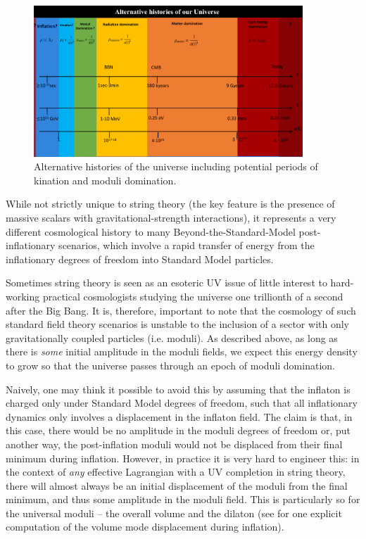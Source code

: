 \begin{figure}[ht]
    \centering
    \includegraphics[width = 0.9\textwidth]{Sections/Figures/FigureAlternativeHistory.pdf} 
    \caption{Alternative histories of the universe including potential periods of kination and moduli domination.}
    \label{fig:AlternativeHistory}
\end{figure}

While not strictly unique to string theory (the key feature is the presence of massive scalars with gravitational-strength interactions), it represents a very different cosmological history to many Beyond-the-Standard-Model post-inflationary scenarios, which involve a rapid transfer of energy from the inflationary degrees of freedom into Standard Model particles.

Sometimes string theory is seen as an esoteric UV issue of little interest to hard-working practical cosmologists studying the universe one trillionth of a second after the Big Bang. It is, therefore, important to note that the cosmology of such standard field theory scenarios is unstable to the inclusion of a sector with only gravitationally coupled particles (i.e. moduli). As described above, as long as there is \emph{some} initial amplitude in the moduli fields, we expect this energy density to grow so that the universe passes through an epoch of moduli domination.

Naively, one may think it possible to avoid this by assuming that the inflaton is charged only under Standard Model degrees of freedom, 
such that all inflationary dynamics only involves a displacement in the inflaton field. The claim is that, in this case, there would be no amplitude in the moduli degrees of freedom or, put another way, the post-inflation moduli would not be displaced from their final minimum during inflation. However, in practice it is very hard to engineer this: in the context of \emph{any} effective Lagrangian with a UV completion in string theory, there will almost always be an initial displacement of the moduli from the final minimum, and thus some amplitude in the moduli field.  This is particularly so for the universal moduli -- the overall volume and the dilaton (see \cite{Cicoli:2016olq} for one explicit computation of the volume mode displacement during inflation).

